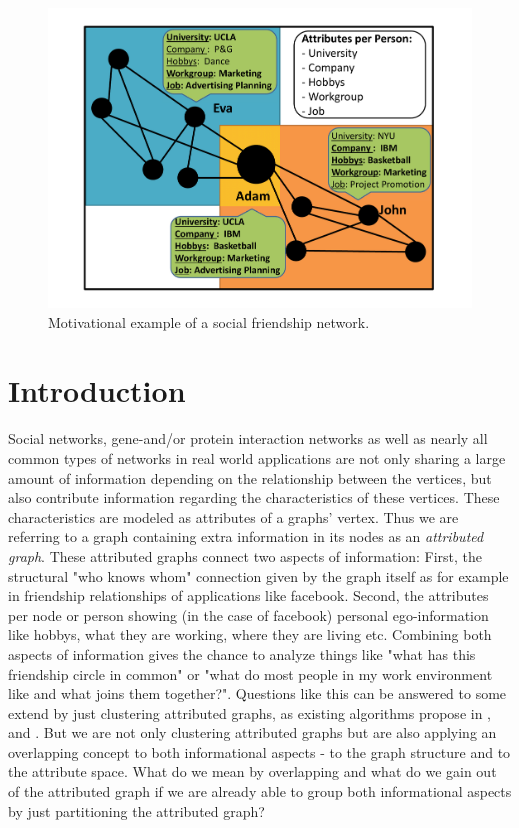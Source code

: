 \begin{figure}[h]
\centering
\includegraphics[width = 0.8\columnwidth]{figure/example.pdf}
\caption{Motivational example of a social friendship network.}
\label{fig:a}
\end{figure}

\section{Introduction}
Social networks, gene-and/or protein interaction networks as well as nearly all common types of networks in real world applications are not only sharing a large amount of information depending on the relationship between the vertices, but also contribute information regarding the characteristics of these vertices. These characteristics are modeled as attributes of a graphs' vertex. Thus we are referring to a graph containing extra information in its nodes as an \emph{attributed graph}. These attributed graphs connect two aspects of information: First, the structural "who knows whom" connection given by the graph itself as for example in friendship relationships of applications like facebook. Second, the attributes per node or person showing (in the case of facebook) personal ego-information like hobbys, what they are working, where they are living etc. Combining both aspects of information gives the chance to analyze things like "what has this friendship circle in common" or "what do most people in my work environment like and what joins them together?". Questions like this can be answered to some extend by just clustering attributed graphs, as existing algorithms propose in \cite{DBLP:conf/icdm/ZhouCY10}, \cite{DBLP:conf/sigmod/XuKWCC12} and \cite{DBLP:journals/pvldb/ZhouCY09}. But we are not only clustering attributed graphs but are also applying an overlapping concept to both informational aspects - to the graph structure and to the attribute space. What do we mean by overlapping and what do we gain out of the attributed graph if we are already able to group both informational aspects by just partitioning the attributed graph?


